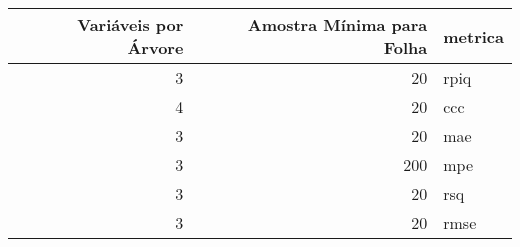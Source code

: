 
\begin{tabular}{r|r|l}
\hline
Variáveis por Árvore & Amostra Mínima para Folha & metrica\\
\hline
3 & 20 & rpiq\\
\hline
4 & 20 & ccc\\
\hline
3 & 20 & mae\\
\hline
3 & 200 & mpe\\
\hline
3 & 20 & rsq\\
\hline
3 & 20 & rmse\\
\hline
\end{tabular}
